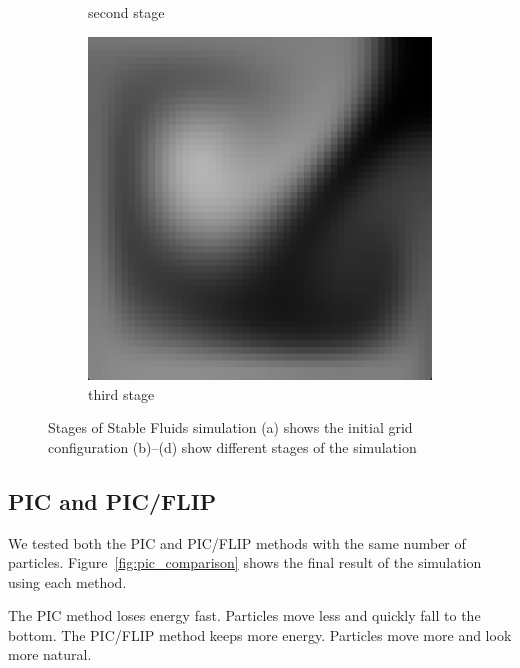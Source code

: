 \begin{figure}[h]
\begin{subfigure}[b]{0.2\textwidth}
        \caption{second stage}
    \end{subfigure}
    \begin{subfigure}[b]{0.2\textwidth}
        \includegraphics[width=\textwidth]{figures/grid50_3.png}
        \caption{third stage}
    \end{subfigure}
    \caption{Stages of Stable Fluids simulation 
    (a) shows the initial grid configuration
    (b)–(d) show different stages of the simulation}
    \label{fig:grid}
\end{figure}

\subsection{PIC and PIC/FLIP}

We tested both the PIC and PIC/FLIP methods with the same number of particles. Figure~\ref{fig:pic_comparison} shows the final result of the simulation using each method.

The PIC method loses energy fast. Particles move less and quickly fall to the bottom.
The PIC/FLIP method keeps more energy. Particles move more and look more natural.

